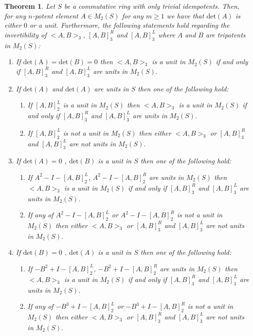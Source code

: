 \documentclass[12pt]{amsart}
\newtheorem{theorem}{Theorem}[section]
\theoremstyle{definition}
\numberwithin{equation}{section}
\begin{document}
\begin{theorem}\label{THM: Commutators and Anticommutators in matrix rings over Rings with only trivial idempotents}
    Let $S$ be a commutative ring with only trivial idempotents. Then, for any $n$-potent element $A\in M_2(S)$ for any $m \geq 1$ we have that $\mathrm{det}(A)$ is either $0$ or a unit. Furthermore, the following statements hold regarding the invertibility of $<A,B>_3$, $[A,B]_3^R$ and $[A,B]_3^L$ where $A$ and $B$ are tripotents in $M_2(S)$:
    \begin{enumerate}
        \item If $\mathrm{det(A)}=\mathrm{det}(B)=0$ then $<A,B>_3$ is a unit in $M_2(S)$ if and only if $[A,B]_3^R$ and $[A,B]_3^L$ are units in $M_2(S).$\item If $\mathrm{det}(A) $  and $\mathrm{det}(A)$ are units in $S$ then one of the following hold:
        \begin{enumerate}
              \item If $[A,B]_2^L$ is a unit in $M_2(S)$  then $<A,B>_3$ is a unit in $M_2(S)$ if and only if $[A,B]_3^R$ and $[A,B]_3^L$ are units in $M_2(S).$
        \item If $[A,B]_2^L$  is not a unit in $M_2(S)$  then either $<A,B>_3$ or  $[A,B]_3^R$ and $[A,B]_3^L$ are not units in $M_2(S).$
        \end{enumerate}
        \item If $\mathrm{det}(A)=0$ , $\mathrm{det}(B)$ is a unit in $S$ then one of the following hold: \begin{enumerate}
            \item If $A^2-I-[A,B]_2^L$, $A^2-I-[A,B]_2^R$ are units in $M_2(S)$  then $<A,B>_3$ is a unit in $M_2(S)$ if and only if $[A,B]_3^R$ and $[A,B]_3^L$ are units in $M_2(S).$
        \item If any of $A^2-I-[A,B]_2^L$ or $A^2-I-[A,B]_2^R$ is not a unit in $M_2(S)$  then either $<A,B>_3$ or  $[A,B]_3^R$ and $[A,B]_3^L$ are not units in $M_2(S).$
        
        \end{enumerate}
  \item If $\mathrm{det}(B)=0$ , $\mathrm{det}(A)$ is a unit in $S$ then one of the following hold: \begin{enumerate}
            \item If $-B^2+I-[A,B]_2^L$, $-B^2+I-[A,B]_2^R$ are units in $M_2(S)$  then $<A,B>_3$ is a unit in $M_2(S)$ if and only if $[A,B]_3^R$ and $[A,B]_3^L$ are units in $M_2(S).$
        \item If any of $-B^3+I-[A,B]_2^L$ or $-B^3+I-[A,B]_2^R$ is not a unit in $M_2(S)$  then either $<A,B>_3$ or  $[A,B]_3^R$ and $[A,B]_3^L$ are not units in $M_2(S).$
        
        \end{enumerate}
        
    \end{enumerate}
\end{theorem}
\end{document}
